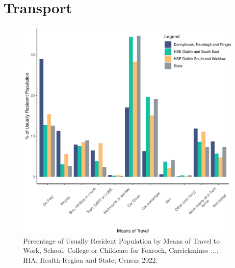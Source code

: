 \documentclass{article}
\begin{document}
\section{Transport}\label{sect:Trans}
\begin{figure}[H]
	\centering
	\includegraphics[width = 120mm]{../figures/TravelED.pdf}
	\caption{Percentage of Usually Resident Population by Means of Travel to Work, School, College or Childcare for Foxrock, Carrickmines ...; IHA, Health Region and State; Census 2022.}
	\label{fig:vbnv}
	\end{figure}
\end{document}
